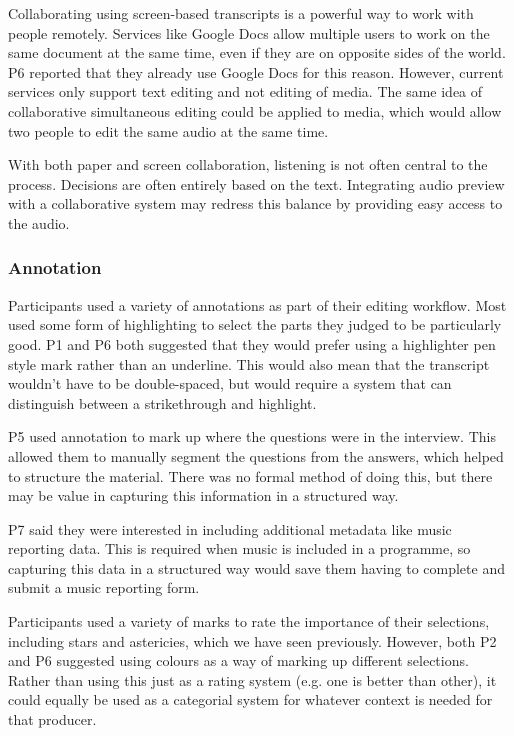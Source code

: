 Collaborating using screen-based transcripts is a powerful way to work with people remotely. Services like Google Docs
allow multiple users to work on the same document at the same time, even if they are on opposite sides of the world. P6
reported that they already use Google Docs for this reason. However, current services only support text editing and not
editing of media. The same idea of collaborative simultaneous editing could be applied to media, which would allow two
people to edit the same audio at the same time.

With both paper and screen collaboration, listening is not often central to the process. Decisions are often entirely
based on the text. Integrating audio preview with a collaborative system may redress this balance by providing easy
access to the audio.

\subsubsection{Annotation}

Participants used a variety of annotations as part of their editing workflow. Most used some form of highlighting to
select the parts they judged to be particularly good. P1 and P6 both suggested that they would prefer using a
highlighter pen style mark rather than an underline. This would also mean that the transcript wouldn't have to be
double-spaced, but would require a system that can distinguish between a strikethrough and highlight.

P5 used annotation to mark up where the questions were in the interview. This allowed them to manually segment the
questions from the answers, which helped to structure the material. There was no formal method of doing this, but there
may be value in capturing this information in a structured way.

P7 said they were interested in including additional metadata like music reporting data. This is required when music is
included in a programme, so capturing this data in a structured way would save them having to complete and submit a
music reporting form.

Participants used a variety of marks to rate the importance of their selections, including stars and astericies, which
we have seen previously. However, both P2 and P6 suggested using colours as a way of marking up different selections.
Rather than using this just as a rating system (e.g. one is better than other), it could equally be used as a
categorial system for whatever context is needed for that producer.

